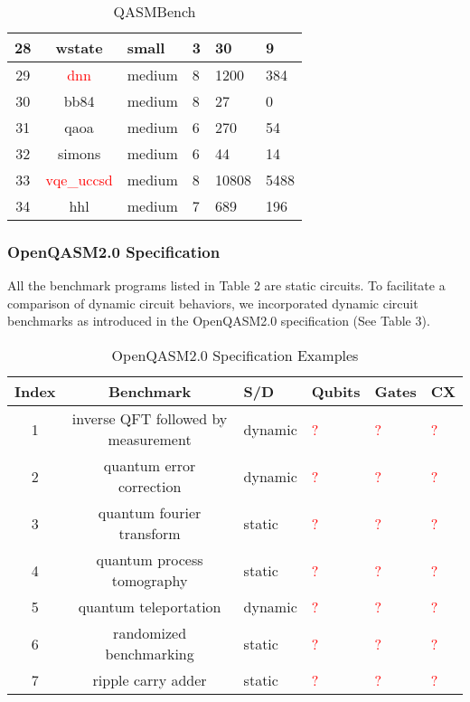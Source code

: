 \documentclass[10pt,a4paper]{article}
\newcommand{\<}{\langle}
\renewcommand{\>}{\rangle}
\newcommand{\red}[1]{\textcolor{red}{#1}}
\newcommand{\todo}{\red{?}}
\begin{document}
\begin{table}[h]
\begin{tabularx}{\textwidth}{|c|c|X|X|X|X|}
\hline
28 & wstate & small & 3 & 30 & 9 \\
\hline
29 & \red{dnn} & medium & 8 & 1200 & 384 \\
\hline
30 & bb84 & medium & 8 & 27 & 0 \\
\hline
31 & qaoa & medium & 6 & 270 & 54 \\
\hline
32 & simons & medium & 6 & 44 & 14 \\
\hline
33 & \red{vqe\_uccsd} & medium & 8 & 10808 & 5488 \\
\hline
34 & hhl & medium & 7 & 689 & 196 \\
\hline
\end{tabularx}
\caption{QASMBench}
\label{table:qbenchmarks}
\end{table}

\subsubsection{OpenQASM2.0 Specification}

All the benchmark programs listed in Table 2 are static circuits. To facilitate a comparison
of dynamic circuit behaviors, we incorporated dynamic circuit benchmarks as introduced in the
OpenQASM2.0 specification (See Table 3).

\begin{table}[h]
\centering
\begin{tabularx}{\textwidth}{|c|c|X|X|X|X|}
\hline
\textbf{Index} & \textbf{Benchmark} & \textbf{S/D} & \textbf{Qubits} & \textbf{Gates} & \textbf{CX} \\
\hline
1 & inverse QFT followed by measurement & dynamic & \todo & \todo & \todo \\
\hline
2 & quantum error correction & dynamic & \todo & \todo & \todo \\
\hline
3 & quantum fourier transform & static & \todo & \todo & \todo \\
\hline
4 & quantum process tomography & static & \todo & \todo & \todo \\
\hline
5 & quantum teleportation & dynamic & \todo & \todo & \todo \\
\hline
6 & randomized benchmarking & static & \todo & \todo & \todo \\
\hline
7 & ripple carry adder & static & \todo & \todo & \todo \\
\hline
\end{tabularx}
\caption{OpenQASM2.0 Specification Examples}
\label{table:qbenchmarks}
\end{table}
\end{document}
